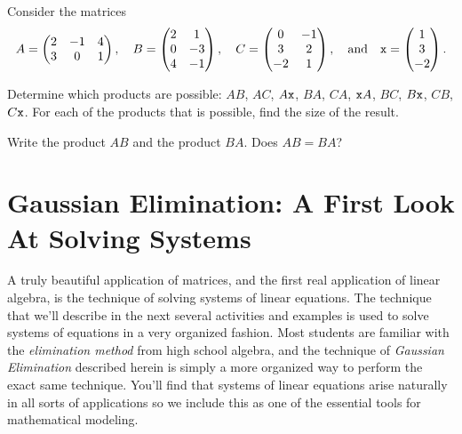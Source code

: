 % 
\begin{problem}
Consider the matrices
\[ A = \begin{pmatrix} 2 & -1 & 4 \\ 3 & 0 & 1 \end{pmatrix}, \quad B = \begin{pmatrix} 2 & 1 \\ 0 & -3 \\ 4 & -1 \end{pmatrix},
    \quad C = \begin{pmatrix} 0 & -1 \\ 3 & 2 \\ -2 & 1 \end{pmatrix}, \quad \text{and} \quad \texttt{x} =
    \begin{pmatrix} 1 \\ 3 \\ -2 \end{pmatrix}. \]
\ba
    \item Determine which products are possible: $AB$, $AC$, $A\texttt{x}$, $BA$,
        $CA$, $\texttt{x} A$, $BC$, $B\texttt{x}$, $CB$, $C\texttt{x}$. For
        each of the products that is possible, find the size of the result.
    \item Write the product $AB$ and the product $BA$.  Does $AB = BA$?
\ea
\end{problem}

\newpage\section{Gaussian Elimination: A First Look At Solving Systems}
A truly beautiful application of matrices, and the first real application of linear
algebra, is the technique of solving systems of linear equations.  The technique that
we'll describe in the next several activities and examples is used to solve systems of
equations in a very organized fashion.  Most students are familiar with the {\it
elimination method} from high school algebra, and the technique of {\it Gaussian
Elimination} described herein is simply a more organized way to perform the exact same
technique.  You'll find that systems of linear equations arise naturally in all sorts of
applications so we include this as one of the essential tools for mathematical modeling.


